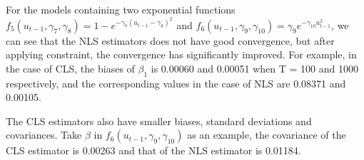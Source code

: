 \documentclass[a4paper,12pt,times,numbered,print,index]{report}
\numberwithin{equation}{section}
\begin{document}
For the models containing two exponential functions $f_{5}\left( u_{t-1}, \gamma_{7}, \gamma_{8}\right) = 1-e^{-\gamma_{7}\left(u_{t-1}-\gamma_{8}\right)^{2}}$ and $f_{6}\left( u_{t-1},\gamma _{9}, \gamma_{10}\right) = \gamma_{9} e^{-\gamma_{10}u_{t-1}^2}$, we can see that the NLS estimators does not have good convergence, but after applying constraint, the convergence has significantly improved. For example, in the case of CLS, the biases of $\beta_{1}$ is 0.00060 and 0.00051 when T = 100 and 1000 respectively, and the corresponding values in the case of NLS are 0.08371 and 0.00105. 

The CLS estimators also have smaller biases, standard deviations and covariances. Take $\beta$ in $f_{6}\left( u_{t-1},\gamma _{9}, \gamma_{10}\right)$ as an example, the covariance of the CLS estimator is 0.00263 and that of the NLS estimator is 0.01184.
 
\end{document}
